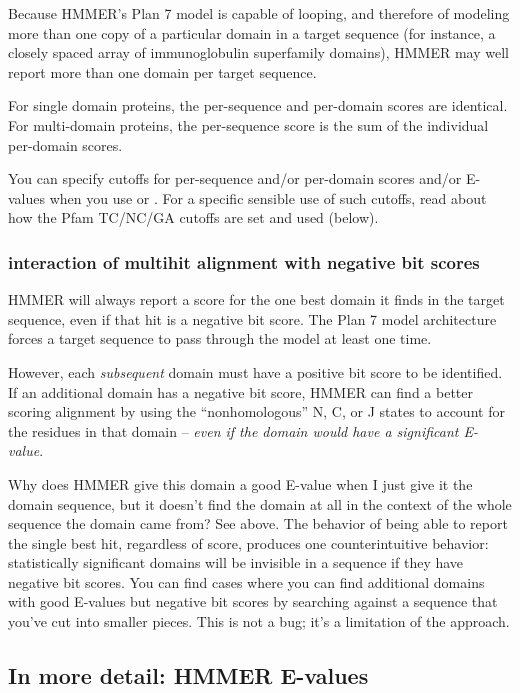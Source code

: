 Because HMMER's Plan 7 model is capable of looping, and therefore of
modeling more than one copy of a particular domain in a target
sequence (for instance, a closely spaced array of immunoglobulin
superfamily domains), HMMER may well report more than one domain per
target sequence.

For single domain proteins, the per-sequence and per-domain scores are
identical. For multi-domain proteins, the per-sequence score is the
sum of the individual per-domain scores.

You can specify cutoffs for per-sequence and/or per-domain scores
and/or E-values when you use  or .  For
a specific sensible use of such cutoffs, read about how the Pfam
TC/NC/GA cutoffs are set and used (below).

\subsubsection{interaction of multihit alignment with negative bit scores}

HMMER will always report a score for the one best domain it finds in
the target sequence, even if that hit is a negative bit score.  The
Plan 7 model architecture forces a target sequence to pass through the
model at least one time.

However, each \emph{subsequent} domain must have a positive bit score
to be identified. If an additional domain has a negative bit score,
HMMER can find a better scoring alignment by using the
``nonhomologous'' N, C, or J states to account for the residues in
that domain -- \emph{even if the domain would have a significant
E-value}.

\begin{srefaq}{Why does HMMER give this domain a good E-value when
I just give it the domain sequence, but it doesn't find the domain at
all in the context of the whole sequence the domain came from?}  See
above. The behavior of being able to report the single best hit,
regardless of score, produces one counterintuitive behavior:
statistically significant domains will be invisible in a sequence if
they have negative bit scores. You can find cases where you can find
additional domains with good E-values but negative bit scores by
searching against a sequence that you've cut into smaller pieces. This
is not a bug; it's a limitation of the approach.
\end{srefaq}


\subsection{In more detail: HMMER E-values}

